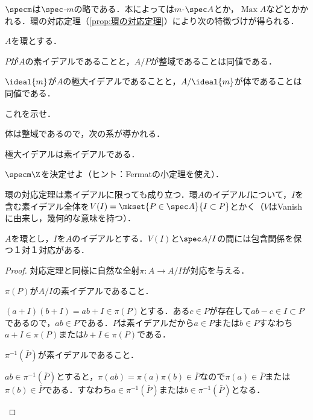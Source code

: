 $\specm$は$\spec$-$m$の略である．本によっては$m$-$\spec A$とか，$\operatorname{Max} A$などとかかれる．環の対応定理（\ref{prop:環の対応定理}）により次の特徴づけが得られる．

\begin{prop}
	$A$を環とする．
	\begin{sakura}
		\item $P$が$A$の素イデアルであることと，$A/P$が整域であることは同値である．
		\item $\ideal{m}$が$A$の極大イデアルであることと，$A/\ideal{m}$が体であることは同値である．
	\end{sakura}
\end{prop}

\begin{exer}
	これを示せ．
\end{exer}

体は整域であるので，次の系が導かれる．

\begin{cor}
	極大イデアルは素イデアルである．
\end{cor}

\begin{exer}
	$\specm \Z$を決定せよ（ヒント：Fermatの小定理を使え）．
\end{exer}

環の対応定理は素イデアルに限っても成り立つ．環$A$のイデアル$I$について，$I$を含む素イデアル全体を$V(I)=\mkset{P\in\spec A}{I\subset P}$とかく（$V$はVanishに由来し，幾何的な意味を持つ）．

\begin{prop}[素イデアルの対応定理]
	$A$を環とし，$I$を$A$のイデアルとする．$V(I)$と$\spec A/I$の間には包含関係を保つ１対１対応がある．
\end{prop}
\begin{proof}
	対応定理と同様に自然な全射$\pi:A\to A/I$が対応を与える．
	\begin{step}
		\item $\pi(P)$が$A/I$の素イデアルであること．
		
		 $(a+I)(b+I)=ab+I\in\pi(P)$とする．ある$c\in P$が存在して$ab-c\in I\subset P$であるので，$ab\in P$である．$P$は素イデアルだから$a\in P$または$b\in P$すなわち$a+I\in\pi(P)$または$b+I\in\pi(P)$である．
		
		\item $\pi^{-1}(\bar{P})$が素イデアルであること．
		
		$ab\in\pi^{-1}(\bar{P})$とすると，$\pi(ab)=\pi(a)\pi(b)\in\bar{P}$なので$\pi(a)\in\bar{P}$または$\pi(b)\in\bar{P}$である．すなわち$a\in\pi^{-1}(\bar{P})$または$b\in\pi^{-1}(\bar{P})$となる．
	\end{step}
\end{proof}


